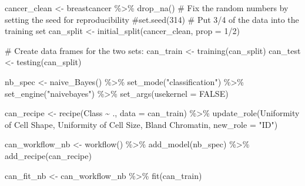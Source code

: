 \documentclass[
  letterpaper,
  DIV=11,
  numbers=noendperiod]{scrreprt}
\newenvironment{Shaded}{\begin{snugshade}}{\end{snugshade}}
\newcommand{\AttributeTok}[1]{\textcolor[rgb]{0.40,0.45,0.13}{#1}}
\newcommand{\CommentTok}[1]{\textcolor[rgb]{0.37,0.37,0.37}{#1}}
\newcommand{\ConstantTok}[1]{\textcolor[rgb]{0.56,0.35,0.01}{#1}}
\newcommand{\DecValTok}[1]{\textcolor[rgb]{0.68,0.00,0.00}{#1}}
\newcommand{\FunctionTok}[1]{\textcolor[rgb]{0.28,0.35,0.67}{#1}}
\newcommand{\NormalTok}[1]{\textcolor[rgb]{0.00,0.23,0.31}{#1}}
\newcommand{\OtherTok}[1]{\textcolor[rgb]{0.00,0.23,0.31}{#1}}
\newcommand{\SpecialCharTok}[1]{\textcolor[rgb]{0.37,0.37,0.37}{#1}}
\newcommand{\StringTok}[1]{\textcolor[rgb]{0.13,0.47,0.30}{#1}}
\begin{document}
\begin{Shaded}
\begin{Highlighting}[]
\NormalTok{cancer\_clean }\OtherTok{\textless{}{-}}\NormalTok{ breastcancer }\SpecialCharTok{\%\textgreater{}\%} \FunctionTok{drop\_na}\NormalTok{()}
\CommentTok{\# Fix the random numbers by setting the seed  for reproducibility}
\CommentTok{\#set.seed(314)}
\CommentTok{\# Put 3/4 of the data into the training set }
\NormalTok{can\_split }\OtherTok{\textless{}{-}} \FunctionTok{initial\_split}\NormalTok{(cancer\_clean, }\AttributeTok{prop =} \DecValTok{1}\SpecialCharTok{/}\DecValTok{2}\NormalTok{)}

\CommentTok{\# Create data frames for the two sets:}
\NormalTok{can\_train }\OtherTok{\textless{}{-}} \FunctionTok{training}\NormalTok{(can\_split)}
\NormalTok{can\_test  }\OtherTok{\textless{}{-}} \FunctionTok{testing}\NormalTok{(can\_split)}
\end{Highlighting}
\end{Shaded}

\begin{Shaded}
\begin{Highlighting}[]
\NormalTok{nb\_spec }\OtherTok{\textless{}{-}} \FunctionTok{naive\_Bayes}\NormalTok{() }\SpecialCharTok{\%\textgreater{}\%} 
  \FunctionTok{set\_mode}\NormalTok{(}\StringTok{"classification"}\NormalTok{) }\SpecialCharTok{\%\textgreater{}\%} 
  \FunctionTok{set\_engine}\NormalTok{(}\StringTok{"naivebayes"}\NormalTok{) }\SpecialCharTok{\%\textgreater{}\%} 
  \FunctionTok{set\_args}\NormalTok{(}\AttributeTok{usekernel =} \ConstantTok{FALSE}\NormalTok{)  }


\NormalTok{can\_recipe }\OtherTok{\textless{}{-}} 
  \FunctionTok{recipe}\NormalTok{(Class }\SpecialCharTok{\textasciitilde{}}\NormalTok{ ., }\AttributeTok{data =}\NormalTok{ can\_train) }\SpecialCharTok{\%\textgreater{}\%} 
  \FunctionTok{update\_role}\NormalTok{(}\StringTok{\textasciigrave{}}\AttributeTok{Uniformity of Cell Shape}\StringTok{\textasciigrave{}}\NormalTok{,  }\StringTok{\textasciigrave{}}\AttributeTok{Uniformity of Cell Size}\StringTok{\textasciigrave{}}\NormalTok{, }\StringTok{\textasciigrave{}}\AttributeTok{Bland Chromatin}\StringTok{\textasciigrave{}}\NormalTok{, }\AttributeTok{new\_role =} \StringTok{"ID"}\NormalTok{)}
  

\NormalTok{can\_workflow\_nb }\OtherTok{\textless{}{-}} \FunctionTok{workflow}\NormalTok{() }\SpecialCharTok{\%\textgreater{}\%}
  \FunctionTok{add\_model}\NormalTok{(nb\_spec) }\SpecialCharTok{\%\textgreater{}\%}
  \FunctionTok{add\_recipe}\NormalTok{(can\_recipe)}

\NormalTok{can\_fit\_nb }\OtherTok{\textless{}{-}}\NormalTok{ can\_workflow\_nb }\SpecialCharTok{\%\textgreater{}\%} \FunctionTok{fit}\NormalTok{(can\_train)}
\end{Highlighting}
\end{Shaded}
\end{document}
